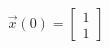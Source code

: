 \documentclass[preview]{standalone}
\begin{document}
\begin{align*}
\vec{x}(0) = \begin{bmatrix} 1 \\ 1 \end{bmatrix}
\end{align*}
\end{document}
